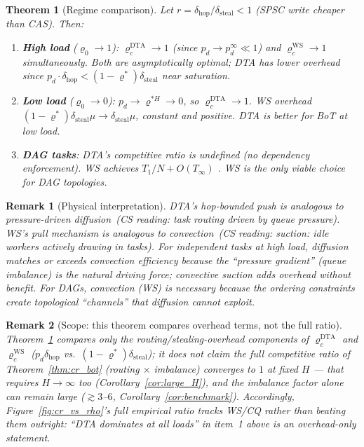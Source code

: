 \documentclass[11pt,a4paper]{report}
\newtheorem{theorem}{Theorem}[section]
\newtheorem{remark}{Remark}[section]
\newcommand{\physics}[2]{#1\ \textnormal{(\emph{CS reading}: #2)}}
\begin{document}
\begin{theorem}[Regime comparison]\label{thm:regime_compare}
Let $r = \delta_{\mathrm{hop}}/\delta_{\mathrm{steal}} < 1$ (SPSC write cheaper
than CAS).  Then:
\begin{enumerate}
  \item \textbf{High load} ($\varrho_0 \to 1$):
        $\varrho_c^{\mathrm{DTA}} \to 1$ (since $p_d \to p_d^{\infty} \ll 1$)
        and $\varrho_c^{\mathrm{WS}} \to 1$ simultaneously.
        Both are asymptotically optimal; DTA has lower overhead since
        $p_d \cdot \delta_{\mathrm{hop}} < (1-\varrho^*)\delta_{\mathrm{steal}}$
        near saturation.

  \item \textbf{Low load} ($\varrho_0 \to 0$):
        $p_d \to \varrho^{*H} \to 0$, so $\varrho_c^{\mathrm{DTA}} \to 1$.
        WS overhead $(1-\varrho^*)\delta_{\mathrm{steal}}\mu \to \delta_{\mathrm{steal}}\mu$,
        constant and positive.  DTA is better for BoT at low load.

  \item \textbf{DAG tasks}:
        DTA's competitive ratio is undefined (no dependency enforcement).
        WS achieves $T_1/N + O(T_\infty)$ \cite{blumofe1999}.
        WS is the only viable choice for DAG topologies.
\end{enumerate}
\end{theorem}

\begin{remark}[Physical interpretation]
DTA's hop-bounded push is analogous to
\physics{pressure-driven diffusion}{task routing driven by queue pressure}.
WS's pull mechanism is analogous to
\physics{convection}{suction: idle workers actively drawing in tasks}.
For independent tasks at high load, diffusion matches or exceeds convection
efficiency because the ``pressure gradient'' (queue imbalance) is the natural
driving force; convective suction adds overhead without benefit.
For DAGs, convection (WS) is necessary because the ordering constraints
create topological ``channels'' that diffusion cannot exploit.
\end{remark}

\begin{remark}[Scope: this theorem compares overhead terms, not the full ratio]
\label{rem:regime_compare_scope}
Theorem~\ref{thm:regime_compare} compares only the \emph{routing/stealing-overhead}
components of $\varrho_c^{\mathrm{DTA}}$ and $\varrho_c^{\mathrm{WS}}$
($p_d\delta_{\mathrm{hop}}$ vs.\ $(1-\varrho^*)\delta_{\mathrm{steal}}$); it does
not claim the \emph{full} competitive ratio of Theorem~\ref{thm:cr_bot}
(routing $\times$ imbalance) converges to $1$ at fixed $H$ --- that requires
$H\to\infty$ too (Corollary~\ref{cor:large_H}), and the imbalance factor alone
can remain large ($\gtrsim3$--$6$, Corollary~\ref{cor:benchmark}). Accordingly,
Figure~\ref{fig:cr_vs_rho}'s full empirical ratio tracks WS/CQ rather than
beating them outright: ``DTA dominates at all loads'' in item~1 above is an
overhead-only statement.
\end{remark}
\end{document}

